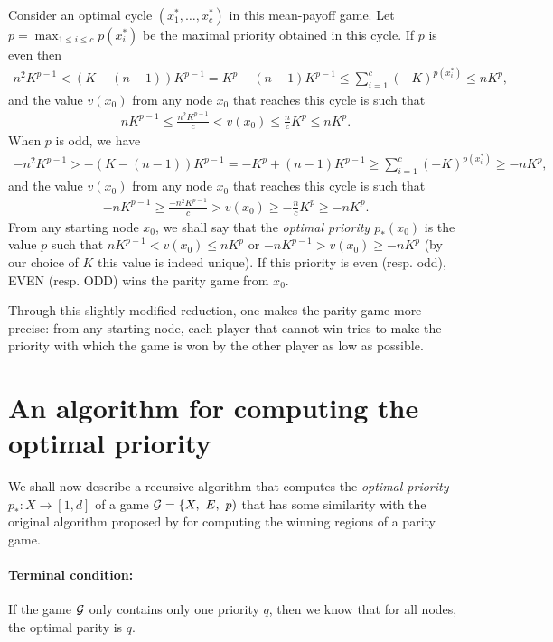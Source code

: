 \documentclass{article}
\def\G{{\cal G}}
\begin{document}
Consider an optimal cycle $(x^*_1,\dots,x^*_c)$ in this mean-payoff game. Let $p=\max_{1 \le i \le c} p(x^*_i)$ be the maximal priority obtained in this cycle. If $p$ is even then
\begin{align}
n^2 K^{p-1} <  (K-(n-1))K^{p-1} =   K^p - (n-1) K^{p-1}  \le \sum_{i=1}^{c} (-K)^{p(x^*_i)} \le n K^p,
\end{align}
and the value $v(x_0)$ from any node $x_0$ that reaches this cycle is such that
\begin{align}
  n K^{p-1} \le \frac{n^2 K^{p-1}}{c} < v(x_0) \le \frac{n}{c} K^p \le n K^p. 
\end{align}
When $p$ is odd, we have
\begin{align}
  - n^2 K^{p-1} > -(K-(n-1))K^{p-1} =   -K^p + (n-1) K^{p-1} \ge \sum_{i=1}^{c} (-K)^{p(x^*_i)} \ge -n K^p,
\end{align}
and the value $v(x_0)$ from any node $x_0$ that reaches this cycle is such that
\begin{align}
  -n K^{p-1} \ge \frac{-n^2 K^{p-1}}{c} > v(x_0) \ge -\frac{n}{c}K^p \ge - n K^p. 
\end{align}
From any starting node $x_0$, we shall say that the \emph{optimal priority $p_*(x_0)$} is the value $p$ such that $n K^{p-1} < v(x_0) \le n K^p$ or $-n K^{p-1} > v(x_0) \ge -n K^p$ (by our choice of $K$ this value is indeed unique). If this priority is even (resp. odd), EVEN (resp. ODD) wins the parity game from $x_0$.

Through this slightly modified reduction, one makes the parity game more precise: from any starting node, each player that cannot win tries to make the priority with which the game is won by the other player as low as possible. 


\section{An algorithm for computing the optimal priority}

We shall now describe a recursive algorithm that computes the \emph{optimal priority} $p_*:X \to [1,d]$ of a game $\G = \{ X,~ E,~ p)$ that has some similarity with the original algorithm proposed by \citet{zielonka98} for computing the winning regions of a parity game. 
\paragraph{Terminal condition:} If the game $\G$ only contains only one priority $q$, then we know that for all nodes, the optimal parity is $q$.
\end{document}
